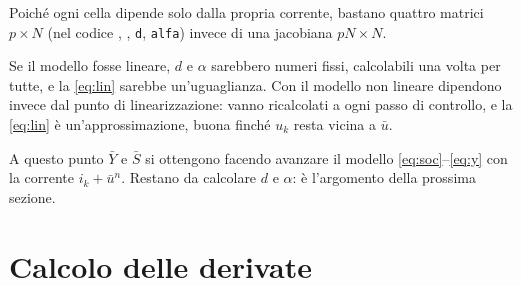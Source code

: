 \documentclass[11pt,a4paper]{article}
\newcommand{\file}[1]{\texttt{\detokenize{#1}}}
\begin{document}
Poiché ogni cella dipende solo dalla propria corrente, bastano quattro matrici
$p\times N$ (nel codice \file{Y_bar}, \file{S_bar}, \texttt{d}, \texttt{alfa})
invece di una jacobiana $pN \times N$.

Se il modello fosse lineare, $d$ e $\alpha$ sarebbero numeri fissi, calcolabili una
volta per tutte, e la \eqref{eq:lin} sarebbe un'uguaglianza. Con il modello non
lineare dipendono invece dal punto di linearizzazione: vanno ricalcolati a ogni
passo di controllo, e la \eqref{eq:lin} è un'approssimazione, buona finché
$u_k$ resta vicina a $\bar u$.

A questo punto $\bar Y$ e $\bar S$ si ottengono facendo avanzare il modello
\eqref{eq:soc}--\eqref{eq:y} con la corrente $i_k + \bar u^n$. Restano da
calcolare $d$ e $\alpha$: è l'argomento della prossima sezione.

\section{Calcolo delle derivate}\label{sec:derivate}
\end{document}
